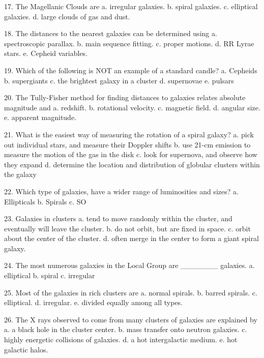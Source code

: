   17.  The Magellanic Clouds are
      a.  irregular galaxies.
      b.  spiral galaxies.
      c.  elliptical galaxies.
      d.  large clouds of gas and dust.
             
  18. The distances to the nearest galaxies can be determined using
      a.  spectroscopic parallax.
      b.  main sequence fitting.
      c.  proper motions.
      d.  RR Lyrae stars.
      e.  Cepheid variables.
       
   19. Which of the following is NOT an example of a standard candle?
      a.  Cepheids
      b.  supergiants
      c.  the brightest galaxy in a cluster
      d.  supernovae
      e.  pulsars
      
  20. The Tully-Fisher method for finding distances to galaxies relates absolute magnitude and
      a.  redshift.
      b.  rotational velocity.
      c.  magnetic field.
      d.  angular size.
      e.  apparent magnitude.
      
 21. What is the easiest way of measuring the rotation of a spiral galaxy?
      a.  pick out individual stars, and measure their Doppler shifts
      b.  use 21-cm emission to measure the motion of the gas in the disk
      c.  look for supernova, and observe how they expand
      d.  determine the location and distribution of globular clusters within the galaxy
      
 22. Which type of galaxies, have a wider range of luminosities and sizes?
      a.  Ellipticals
      b.  Spirals
      c.  SO
      
 23. Galaxies in clusters
      a.  tend to move randomly within the cluster, and eventually will leave the cluster.
      b.  do not orbit, but are fixed in space.
      c.  orbit about the center of the cluster.
      d.  often merge in the center to form a giant spiral galaxy.
                
 24. The most numerous galaxies in the Local Group are _______ galaxies.
      a.  elliptical
      b.  spiral
      c.  irregular
      
 25. Most of the galaxies in rich clusters are
      a.  normal spirals.
      b.  barred spirals.
      c.  elliptical.
      d.  irregular.
      e.  divided equally among all types.
      
 26. The X rays observed to come from many clusters of galaxies are explained by
      a.  a black hole in the cluster center.
      b.  mass transfer onto neutron galaxies.
      c.  highly energetic collisions of galaxies.
      d.  a hot intergalactic medium.
      e.  hot galactic halos.
      
